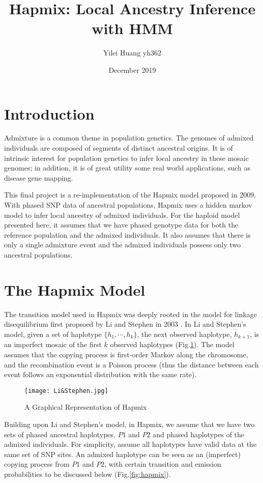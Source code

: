 \documentclass{article}
\title{\LARGE \textbf{Hapmix: Local Ancestry Inference with HMM}}
\author{Yilei Huang yh362}
\date{December 2019}
\begin{document}
\maketitle

\section{Introduction}
    Admixture is a common theme in population genetics. The genomes of admixed individuals are composed of segments of distinct ancestral origins. It is of intrinsic interest for population genetics to infer local ancestry in these mosaic genomes; in addition, it is of great utility some real world applications, such as disease gene mapping.  

    This final project is a re-implementation of the Hapmix model proposed in 2009\cite{hapmix}. With phased SNP data of ancestral populations, Hapmix uses a hidden markov model to infer local ancestry of admixed individuals. For the haploid model presented here, it assumes that we have phased genotype data for both the reference population and the admixed individuals. It also assumes that there is only a single admixture event and the admixed individuals possess only two ancestral populations. 
\section{The Hapmix Model}
    The transition model used in Hapmix was deeply rooted in the model for linkage disequilibrium first propsoed by Li and Stephen in 2003 \cite{Li and Stephen}. In Li and Stephen's model, given a set of haplotype $\{h_1,\cdots,h_k\}$, the next observed haplotype, $h_{k+1}$, is an imperfect mosaic of the first $k$ observed haplotypes (Fig.\ref{fig:Li}). The model assumes that the copying process is first-order Markov along the chromosome, and the recombination event is a Poisson process (thus the distance between each event follows an exponential distribution with the same rate). 
    
    \begin{figure}[H]
        \texttt{[image: Li\&Stephen.jpg]}
        \centering
        \caption{A Graphical Representation of Hapmix \cite{Li and Stephen}} \label{fig:Li}
    \end{figure}
    
    
    Building upon Li and Stephen's model, in Hapmix, we assume that we have two sets of phased ancestral haplotypes, $P1$ and $P2$ and phased haplotypes of the admixed individuals. For simplicity, assume all haplotypes have valid data at the same set of SNP sites. An admixed haplotype can be seen as an (imperfect) copying process from $P1$ and $P2$, with certain transition and emission probabilities to be discussed below (Fig.\ref{fig:hapmix}). 
    
\end{document}
